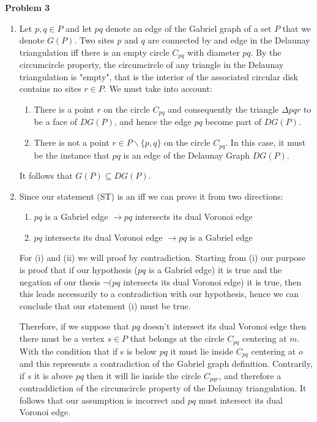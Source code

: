 \documentclass[12pt]{article}
\begin{document}
\noindent \textbf{Problem 3}\\
\begin{enumerate}[label=\alph*)]
	\item Let $p,q \in P$ and let $pq$ denote an edge of the Gabriel graph of a set $P$ that we denote $G(P)$. Two sites $p$ and $q$ are connected by and edge in the Delaunay triangulation iff there is an empty circle $C_{pq}$ with diameter $pq$. By the circumcircle property, the circumcircle of any triangle in the Delaunay triangulation is "empty", that is the interior of the associated circular disk contains no sites $r \in P$. We must take into account:
	
	\begin{enumerate}[label=\roman*)]
		\item There is a point $r$ on the circle $C_{pq}$ and consequently the triangle $\Delta pqr$ to be a face of $DG(P)$, and hence the edge $pq$ become part of $DG(P)$.
		\item There is not a point $r \in P \backslash \{p,q\}$ on the circle $C_{pq}$. In this case, it must be the instance that $pq$ is an edge of the Delaunay Graph $DG(P)$.
	\end{enumerate}
	\noindent It follows that $G(P) \subseteq DG(P)$. \\
	
	\item Since our statement (ST) is an iff we can prove it from two directions:
	\begin{enumerate}[label=\roman*)]
		\item $pq$ is a Gabriel edge $\rightarrow pq$ intersects its dual Voronoi edge
		\item $pq$ intersects its dual Voronoi edge $\rightarrow pq$ is a Gabriel edge
	\end{enumerate}
			
	For (i) and (ii) we will proof by contradiction. Starting from (i) our purpose is proof that if our hypothesis ($pq$ is a Gabriel edge) it is true and the negation of our thesis $\neg (pq$ intersects its dual Voronoi edge) it is true, then this leads necessarily to a contradiction with our hypothesis, hence we can conclude that our statement (i) must be true.
	
	Therefore, if we suppose that $pq$ doesn't intersect its dual Voronoi edge then there must be a vertex $s \in P$ that belongs at the circle $C_{pq}$ centering at $m$. With the condition that if s is below $pq$ it must lie inside $C_{pq}$ centering at $o$ and this represents a contradiction of the Gabriel graph definition. Contrarily, if $s$ it is above $pq$ then it will lie inside the circle $C_{pqr}$, and therefore a contraddiction of the circumcircle property of the Delaunay triangulation. It follows that our assumption is incorrect and $pq$ must intersect its dual Voronoi edge.
	

\end{enumerate}
\end{document}
